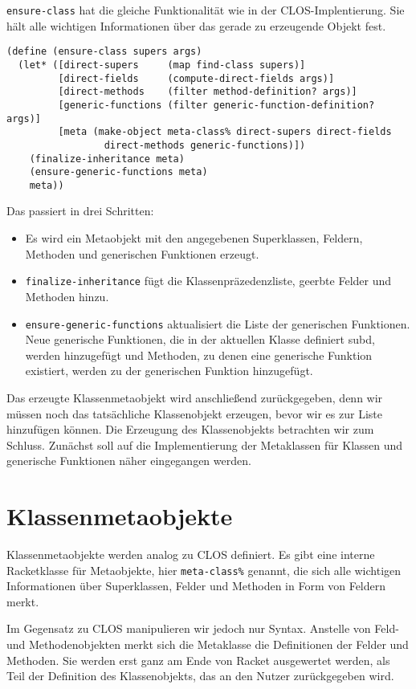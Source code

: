 \texttt{ensure-class} hat die gleiche Funktionalität wie in der CLOS-Implentierung. Sie hält alle wichtigen Informationen über das gerade zu erzeugende Objekt fest. 

\begin{lstlisting}
(define (ensure-class supers args)
  (let* ([direct-supers     (map find-class supers)]  
         [direct-fields     (compute-direct-fields args)]
         [direct-methods    (filter method-definition? args)]
         [generic-functions (filter generic-function-definition? args)]
         [meta (make-object meta-class% direct-supers direct-fields
                 direct-methods generic-functions)])
    (finalize-inheritance meta)
    (ensure-generic-functions meta)
    meta))
\end{lstlisting}


Das passiert in drei Schritten:
\begin{itemize}
 \item Es wird ein Metaobjekt mit den angegebenen Superklassen, Feldern, Methoden und generischen Funktionen erzeugt.
 \item \texttt{finalize-inheritance} fügt die Klassenpräzedenzliste, geerbte Felder und Methoden hinzu.
 \item \texttt{ensure-generic-functions} aktualisiert die Liste der generischen Funktionen. Neue generische Funktionen, die in der aktuellen Klasse definiert subd, werden hinzugefügt und Methoden, zu denen eine generische Funktion existiert, werden zu der generischen Funktion hinzugefügt.
\end{itemize}

Das erzeugte Klassenmetaobjekt wird anschließend zurückgegeben, denn wir müssen noch das tatsächliche Klassenobjekt erzeugen, bevor wir es zur Liste hinzufügen können. Die Erzeugung des Klassenobjekts betrachten wir zum Schluss. Zunächst soll auf die Implementierung der Metaklassen für Klassen und generische Funktionen näher eingegangen werden.

\section{Klassenmetaobjekte}
Klassenmetaobjekte werden analog zu CLOS definiert. Es gibt eine interne Racketklasse für Metaobjekte, hier \texttt{meta-class\%} genannt, die sich alle wichtigen Informationen über Superklassen, Felder und Methoden in Form von Feldern merkt.

Im Gegensatz zu CLOS manipulieren wir jedoch nur Syntax. Anstelle von Feld- und Methodenobjekten merkt sich die Metaklasse die Definitionen der Felder und Methoden. Sie werden erst ganz am Ende von Racket ausgewertet werden, als Teil der Definition des Klassenobjekts, das an den Nutzer zurückgegeben wird.

